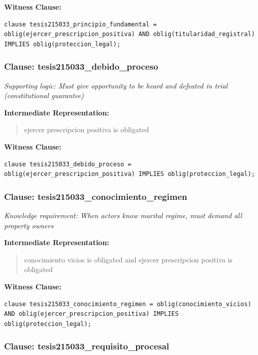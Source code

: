 \documentclass[11pt,a4paper]{article}
\begin{document}
\textbf{Witness Clause:}

\begin{lstlisting}[style=witnessstyle, language=Witness]
clause tesis215033_principio_fundamental = oblig(ejercer_prescripcion_positiva) AND oblig(titularidad_registral) IMPLIES oblig(proteccion_legal);
\end{lstlisting}

\subsubsection{Clause: tesis215033\_debido\_proceso}

\textit{Supporting logic: Must give opportunity to be heard and defeated in trial (constitutional guarantee)}

\textbf{Intermediate Representation:}

\begin{quote}
ejercer prescripcion positiva is obligated
\end{quote}

\textbf{Witness Clause:}

\begin{lstlisting}[style=witnessstyle, language=Witness]
clause tesis215033_debido_proceso = oblig(ejercer_prescripcion_positiva) IMPLIES oblig(proteccion_legal);
\end{lstlisting}

\subsubsection{Clause: tesis215033\_conocimiento\_regimen}

\textit{Knowledge requirement: When actors know marital regime, must demand all property owners}

\textbf{Intermediate Representation:}

\begin{quote}
conocimiento vicios is obligated and ejercer prescripcion positiva is obligated
\end{quote}

\textbf{Witness Clause:}

\begin{lstlisting}[style=witnessstyle, language=Witness]
clause tesis215033_conocimiento_regimen = oblig(conocimiento_vicios) AND oblig(ejercer_prescripcion_positiva) IMPLIES oblig(proteccion_legal);
\end{lstlisting}

\subsubsection{Clause: tesis215033\_requisito\_procesal}
\end{document}
